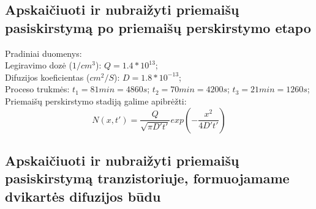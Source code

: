 \documentclass[11pt,a4paper]{article}
\begin{document}
\subsection{Apskaičiuoti ir nubraižyti priemaišų pasiskirstymą po priemaišų perskirstymo etapo}
Pradiniai duomenys:\\
Legiravimo dozė ($1/cm^3$): $Q = 1.4*10^{13}$;\\
Difuzijos koeficientas ($cm^2/S$): $D = 1.8*10^{-13}$;\\
Proceso trukmės: $t_1 = 81min = 4860s$; $t_2 = 70min = 4200s$; $t_3 = 21min = 1260s$;\\
Priemaišų perskirstymo stadiją galime apibrėžti:\\
\[N(x,t') = \frac{Q}{\sqrt{\pi D' t'}} exp \left( - \frac{x^2}{4D't'} \right)  \]


\subsection{Apskaičiuoti ir nubraižyti priemaišų pasiskirstymą tranzistoriuje, formuojamame dvikartės difuzijos būdu}
\end{document}
